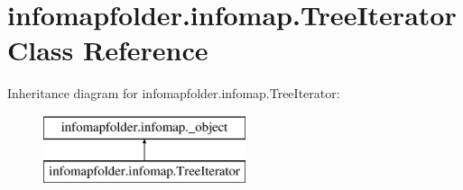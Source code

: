 \hypertarget{classinfomapfolder_1_1infomap_1_1TreeIterator}{}\section{infomapfolder.\+infomap.\+Tree\+Iterator Class Reference}
\label{classinfomapfolder_1_1infomap_1_1TreeIterator}
Inheritance diagram for infomapfolder.\+infomap.\+Tree\+Iterator\+:\begin{figure}[H]
\begin{center}
\leavevmode
\includegraphics[height=2.000000cm]{classinfomapfolder_1_1infomap_1_1TreeIterator}
\end{center}
\end{figure}
